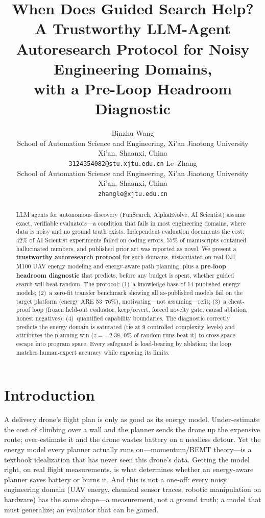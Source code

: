 \documentclass{article}
\title{When Does Guided Search Help?\\
  A Trustworthy LLM-Agent Autoresearch Protocol for Noisy Engineering Domains,\\
  with a Pre-Loop Headroom Diagnostic}
\author{%
  Binzhu Wang\\
  School of Automation Science and Engineering, Xi'an Jiaotong University\\
  Xi'an, Shaanxi, China\\
  \texttt{3124354082@stu.xjtu.edu.cn}%
  \And
  Le~Zhang\\
  School of Automation Science and Engineering, Xi'an Jiaotong University\\
  Xi'an, Shaanxi, China\\
  \texttt{zhangle@xjtu.edu.cn}%
}
\newcommand{\z}{\ensuremath{z}}
\begin{document}
\maketitle

\begin{abstract}
LLM agents for autonomous discovery (FunSearch, AlphaEvolve, AI Scientist) assume exact,
verifiable evaluators---a condition that fails in most engineering domains, where data
is noisy and no ground truth exists. Independent evaluation documents the cost: 42\% of
AI Scientist experiments failed on coding errors, 57\% of manuscripts contained
hallucinated numbers, and published prior art was reported as novel. We present a
\textbf{trustworthy autoresearch protocol} for such domains, instantiated on real DJI
M100 UAV energy modeling and energy-aware path planning, plus a \textbf{pre-loop
headroom diagnostic} that predicts, before any budget is spent, whether guided search
will beat random. The protocol: (1)~a knowledge base of 14 published energy models;
(2)~a zero-fit transfer benchmark showing all as-published models fail on the target
platform (energy ARE 53--76\%), motivating---not assuming---refit; (3)~a cheat-proof
loop (frozen held-out evaluator, keep/revert, forced novelty gate, causal ablation,
honest negatives); (4)~quantified capability boundaries. The diagnostic correctly
predicts the energy domain is saturated (tie at 9 controlled complexity levels) and
attributes the planning win ($\z=-2.38$, 0\% of random runs beat it) to cross-space
escape into program space. Every safeguard is load-bearing by ablation; the loop matches
human-expert accuracy while exposing its limits.
\end{abstract}

\section{Introduction}
\label{sec:intro}

A delivery drone's flight plan is only as good as its energy model. Under-estimate the
cost of climbing over a wall and the planner sends the drone up the expensive route;
over-estimate it and the drone wastes battery on a needless detour. Yet the energy model
every planner actually runs on---momentum/BEMT theory---is a textbook idealization that has
never seen this drone's data. Getting the model right, on real flight measurements, is
what determines whether an energy-aware planner saves battery or burns it. And this is not
a one-off: every noisy engineering domain (UAV energy, chemical sensor traces, robotic
manipulation on hardware) has the same shape---a measurement, not a ground truth; a model
that must generalize; an evaluator that can be gamed.
\end{document}
